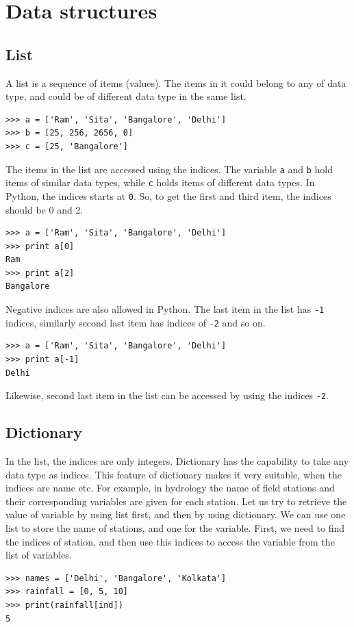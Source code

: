 \documentclass[10pt]{book}
\begin{document}
{\section{Data structures}

\subsection{List}
A list is a sequence of items (values). The items in it could belong to any of data type, and could be of different data type in the same list. 
\beforeverb \begin{verbatim}
>>> a = ['Ram', 'Sita', 'Bangalore', 'Delhi']
>>> b = [25, 256, 2656, 0]
>>> c = [25, 'Bangalore'] 
\end{verbatim} \afterverb
The items in the list are accessed using the indices. The variable \verb"a" and \verb"b" hold items of similar data types, while \verb"c" holds items of different data types. In Python, the indices starts at {\tt 0}. So, to get the first and third item, the indices should be 0 and 2.
\beforeverb
\begin{verbatim}
>>> a = ['Ram', 'Sita', 'Bangalore', 'Delhi']
>>> print a[0]
Ram
>>> print a[2]
Bangalore
\end{verbatim}
\afterverb

Negative indices are also allowed in Python. The last item in the list has {\tt -1} indices, similarly second last item has indices of {\tt -2} and so on.
\beforeverb
\begin{verbatim}
>>> a = ['Ram', 'Sita', 'Bangalore', 'Delhi']
>>> print a[-1]
Delhi
\end{verbatim}
\afterverb
Likewise, second last item in the list can be accessed by using the indices \verb"-2".

\subsection{Dictionary}
In the list, the indices are only integers. Dictionary has the capability to take any data type as indices. This feature of dictionary makes it very suitable, when the indices are name etc. For example, in hydrology the name of field stations and their corresponding variables are given for each station. Let us try to retrieve the value of variable by using list first, and then by using dictionary. We can use one list to store the name of stations, and one for the variable. First, we need to find the indices of station, and then use this indices to access the variable from the list of variables. 
\beforeverb \begin{verbatim}
>>> names = ['Delhi', 'Bangalore', 'Kolkata']
>>> rainfall = [0, 5, 10]
>>> print(rainfall[ind])
5
\end{verbatim} \afterverb

}
\end{document}
